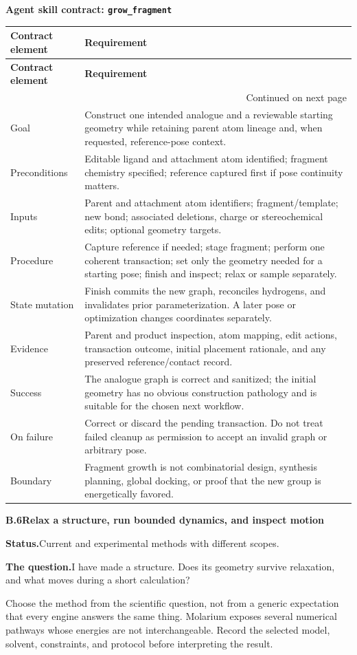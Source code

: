 \documentclass[10pt,letterpaper]{article}
\makeatletter
\newcommand{\code}[1]{\texttt{#1}}
\newcommand{\lead}[1]{\textbf{#1}\hspace{0.35em}}
\newcommand{\workflowsection}[4]{%
  \par\needspace{5\baselineskip}\vspace{7.5pt}%
  {\fontsize{10.91}{13.1}\selectfont\bfseries #1\hspace{1.1em}#2}\par\vspace{2pt}%
  \lead{Status.}#3.\par\vspace{-3.5pt}%
  \lead{The question.}#4\par}
\newenvironment{skillcontract}[1]{%
  \par\needspace{5\baselineskip}\vspace{2pt}%
  {\fontsize{10.91}{13.1}\selectfont\bfseries Agent skill contract: \code{#1}}\par\vspace{1pt}%
  \fontsize{8.4}{10}\selectfont
  \begin{longtable}{@{}K V@{}}
  \toprule
  \textbf{Contract element} & \textbf{Requirement}\\
  \midrule
  \endfirsthead
  \toprule
  \textbf{Contract element} & \textbf{Requirement}\\
  \midrule
  \endhead
  \midrule
  \multicolumn{2}{r}{\footnotesize Continued on next page}\\
  \endfoot
  \bottomrule
  \endlastfoot
}{%
  \end{longtable}
  \normalsize\fontsize{9.96}{11.95}\selectfont}
\newcommand{\contractrow}[2]{#1 & #2\\}
\makeatother
\begin{document}
\begin{skillcontract}{grow\_fragment}
\contractrow{Goal}{Construct one intended analogue and a reviewable starting geometry while retaining parent atom lineage and, when requested, reference-pose context.}
\contractrow{Preconditions}{Editable ligand and attachment atom identified; fragment chemistry specified; reference captured first if pose continuity matters.}
\contractrow{Inputs}{Parent and attachment atom identifiers; fragment/template; new bond; associated deletions, charge or stereochemical edits; optional geometry targets.}
\contractrow{Procedure}{Capture reference if needed; stage fragment; perform one coherent transaction; set only the geometry needed for a starting pose; finish and inspect; relax or sample separately.}
\contractrow{State mutation}{Finish commits the new graph, reconciles hydrogens, and invalidates prior parameterization. A later pose or optimization changes coordinates separately.}
\contractrow{Evidence}{Parent and product inspection, atom mapping, edit actions, transaction outcome, initial placement rationale, and any preserved reference/contact record.}
\contractrow{Success}{The analogue graph is correct and sanitized; the initial geometry has no obvious construction pathology and is suitable for the chosen next workflow.}
\contractrow{On failure}{Correct or discard the pending transaction. Do not treat failed cleanup as permission to accept an invalid graph or arbitrary pose.}
\contractrow{Boundary}{Fragment growth is not combinatorial design, synthesis planning, global docking, or proof that the new group is energetically favored.}
\end{skillcontract}

\workflowsection{B.6}{Relax a structure, run bounded dynamics, and inspect motion}{Current and experimental methods with different scopes}{I have made a structure. Does its geometry survive relaxation, and what moves during a short calculation?}

Choose the method from the scientific question, not from a generic expectation that every engine answers the same thing. Molarium exposes several numerical pathways whose energies are not interchangeable. Record the selected model, solvent, constraints, and protocol before interpreting the result.
\end{document}
